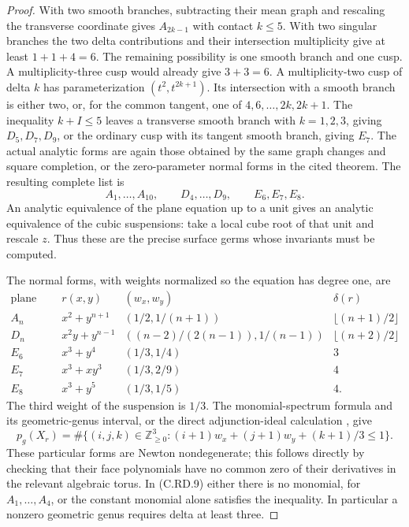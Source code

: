 \begin{proof}
With two smooth branches, subtracting their mean graph
and rescaling the transverse coordinate gives
$A_{2k-1}$ with contact $k\le5$. With two singular
branches the two delta contributions and their
intersection multiplicity give at least $1+1+4=6$.
The remaining possibility is one smooth branch and
one cusp. A multiplicity-three cusp would already
give $3+3=6$. A multiplicity-two cusp of delta $k$
has parameterization $(t^2,t^{2k+1})$.
Its intersection with a smooth branch is either two,
or, for the common tangent, one of
$4,6,\ldots,2k,2k+1$.
The inequality $k+I\le5$ leaves a transverse smooth
branch with $k=1,2,3$, giving $D_5,D_7,D_9$, or the
ordinary cusp with its tangent smooth branch, giving
$E_7$. The actual analytic forms are again those
obtained by the same graph changes and square
completion, or the zero-parameter normal forms in the
cited theorem. The resulting complete list is
\[
              A_1,\ldots,A_{10},\qquad
              D_4,\ldots,D_9,\qquad E_6,E_7,E_8.
\tag{C.RD.7}
\]
An analytic equivalence of the plane equation up to
a unit gives an analytic equivalence of the cubic
suspensions: take a local cube root of that unit and
rescale $z$. Thus these are the precise surface germs
whose invariants must be computed.

The normal forms, with weights normalized so the
equation has degree one, are
\[
\begin{array}{c|c|c|c}
 \text{plane type}&r(x,y)&(w_x,w_y)&\delta(r)\\\hline
 A_n&x^2+y^{n+1}&(1/2,1/(n+1))&\lfloor(n+1)/2\rfloor\\
 D_n&x^2y+y^{n-1}&((n-2)/(2(n-1)),1/(n-1))
                         &\lfloor(n+2)/2\rfloor\\
 E_6&x^3+y^4&(1/3,1/4)&3\\
 E_7&x^3+xy^3&(1/3,2/9)&4\\
 E_8&x^3+y^5&(1/3,1/5)&4.
\end{array}
\tag{C.RD.8}
\]
The third weight of the suspension is $1/3$.
The monomial-spectrum formula and its geometric-genus
interval, or the direct adjunction-ideal calculation
\cite[Theorem 2.1.1 and Corollary 2.1.3]{MerleTeissier1977},
give
\[
 p_g(X_r)=\#\{(i,j,k)\in\mathbb Z_{\ge0}^3:
          (i+1)w_x+(j+1)w_y+(k+1)/3\le1\}.
\tag{C.RD.9}
\]
These particular forms are Newton nondegenerate;
this follows directly by checking that their face
polynomials have no common zero of their derivatives
in the relevant algebraic torus. In (C.RD.9) either
there is no monomial, for $A_1,\ldots,A_4$, or the
constant monomial alone satisfies the inequality.
In particular a nonzero geometric genus requires
delta at least three.


\end{proof}
